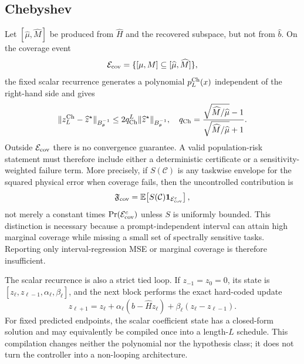 \documentclass[11pt]{article}
\newcommand{\E}{\mathbb E}
\begin{document}
\subsection{Chebyshev}

Let $[\widehat\mu,\widehat M]$ be produced from $\widehat H$ and the recovered
subspace, but not from $\widehat b$.  On the coverage event
\[
 \mathcal E_{\rm cov}
 =\{[\mu,M]\subseteq[\widehat\mu,\widehat M]\},
\]
the fixed scalar recurrence generates a polynomial
$p_L^{\rm Ch}(x)$ independent of the right-hand side and gives
\begin{equation}
 \|z_L^{\rm Ch}-\widehat z^\star\|_{B_\theta^{-1}}
 \leq 2q_{\rm Ch}^{L}
 \|\widehat z^\star\|_{B_\theta^{-1}},
 \quad
 q_{\rm Ch}
 =\frac{\sqrt{\widehat M/\widehat\mu}-1}
 {\sqrt{\widehat M/\widehat\mu}+1}.
 \label{eq:cheb-envelope}
\end{equation}
Outside $\mathcal E_{\rm cov}$ there is no convergence guarantee.  A valid
population-risk statement must therefore include either a deterministic
certificate or a sensitivity-weighted failure term.  More precisely, if
$S(\mathcal C)$ is any taskwise envelope for the squared physical error when
coverage fails, then the uncontrolled contribution is
\begin{equation}
 \mathfrak F_{\rm cov}
 =\E\!\left[S(\mathcal C)\mathbf 1_{\mathcal E_{\rm cov}^{c}}\right],
 \label{eq:sensitivity-coverage-failure}
\end{equation}
not merely a constant times $\Pr(\mathcal E_{\rm cov}^{c})$ unless $S$ is
uniformly bounded.  This distinction is necessary because a prompt-independent
interval can attain high marginal coverage while missing a small set of
spectrally sensitive tasks.  Reporting only interval-regression MSE or marginal
coverage is therefore insufficient.

The scalar recurrence is also a strict tied loop.  If
$z_{-1}=z_0=0$, its state is
$[z_\ell,z_{\ell-1},\alpha_\ell,\beta_\ell]$, and the next block performs the
exact hard-coded update
\[
 z_{\ell+1}=z_\ell+\alpha_\ell
 (\widehat b-\widehat H z_\ell)
 +\beta_\ell(z_\ell-z_{\ell-1}).
\]
For fixed predicted endpoints, the scalar coefficient state has a closed-form
solution and may equivalently be compiled once into a length-$L$ schedule.
This compilation changes neither the polynomial nor the hypothesis class; it
does not turn the controller into a non-looping architecture.
\end{document}
